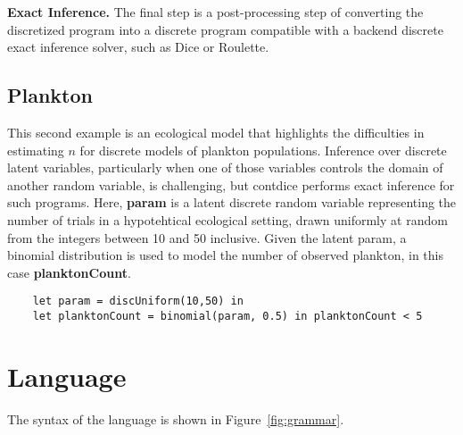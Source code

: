 \documentclass[nonacm,anonymous]{acmart}
\newcommand{\CDice}{\text{\scshape CDice}\xspace}
\begin{document}
\textbf{Exact Inference.} The final step is a post-processing step of converting the discretized program into a discrete program compatible with a backend discrete exact inference solver, such as Dice or Roulette.

\subsection{Plankton}
This second example is an ecological model that highlights the difficulties in estimating $n$ for discrete models of plankton populations. Inference over discrete latent variables, particularly when one of those variables controls the domain of another random variable, is challenging, but contdice performs exact inference for such programs. Here, \textbf{param} is a latent discrete random variable representing the number of trials in a hypotehtical ecological setting, drawn uniformly at random from the integers between 10 and 50 inclusive. Given the latent param, a binomial distribution is used to model the number of observed plankton, in this case \textbf{planktonCount}.

\begin{lstlisting}
    let param = discUniform(10,50) in
    let planktonCount = binomial(param, 0.5) in planktonCount < 5
\end{lstlisting}





\section{Language}

The syntax of the \CDice language is shown in Figure~\ref{fig:grammar}.
\end{document}
